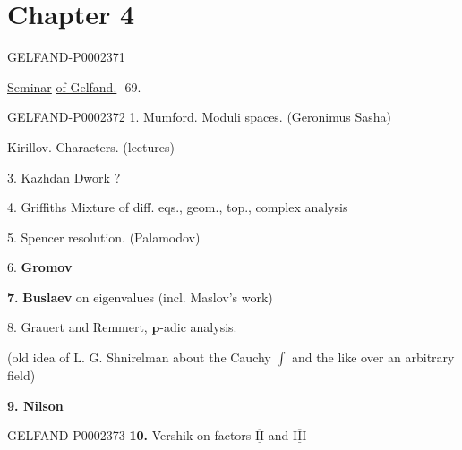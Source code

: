 \clearpage\section*{Chapter 4}

\begin{GelfandAdjacentEvidence}{GELFAND-P000237}{1}
\end{GelfandAdjacentEvidence}

\underline{Seminar} \quad \underline{of Gelfand.} -69.



\begin{GelfandAdjacentEvidence}{GELFAND-P000237}{2}
1. Mumford. Moduli spaces. (Geronimus Sasha)



\end{GelfandAdjacentEvidence}

Kirillov. Characters. (lectures)



3. Kazhdan \quad Dwork ?



4. Griffiths \quad Mixture of diff. eqs., geom., top., complex analysis



5. Spencer resolution. (Palamodov)



6. \textbf{Gromov}

\textbf{7.} \textbf{Buslaev} on eigenvalues (incl. Maslov's work)



8. Grauert and Remmert, $\boldsymbol{p}$-adic analysis.

(old idea of L. G. Shnirelman about the Cauchy $\int$ and the like over an arbitrary field)



\textbf{9. Nilson}



\begin{GelfandAdjacentEvidence}{GELFAND-P000237}{3}
\textbf{10.} Vershik on factors $\underline{\overline{\mathrm{II}}}$ and $\underline{\overline{\mathrm{III}}}$



\end{GelfandAdjacentEvidence}

